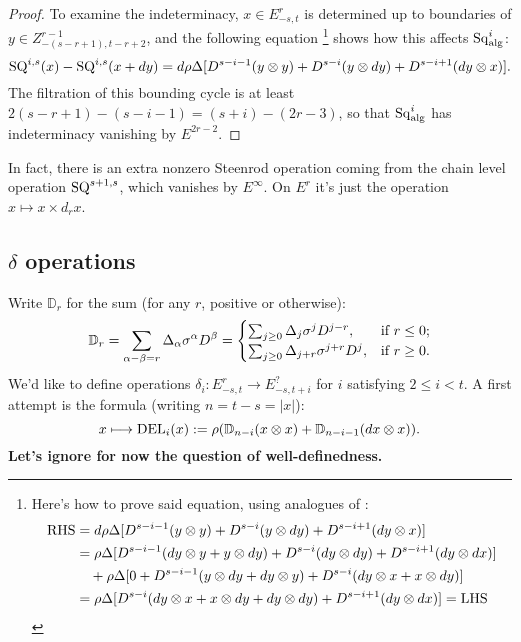 \documentclass[10pt]{article}
\newcommand{\twist}{\sigma}
\newcommand{\Sq}{\mathrm{Sq}}
\begin{document}
\begin{AdamsSSEQ operations final}
\begin{proof}
To examine the indeterminacy, $x\in E^r_{-s,t}$ is determined up to boundaries of $y\in Z^{r-1}_{-(s-r+1),t-r+2}$, and the following equation%
\footnote{Here's how to prove said equation, using analogues of \cite[(1.111),(1.112)]{MR2245560}:
\begin{alignat*}{2}
\textup{RHS}
&=
d\rho\Delta [D^{s-i-1}(y\otimes y)+D^{s-i}(y\otimes dy)+D^{s-i+1}(dy\otimes x)]%
\\
&=
\rho\Delta [D^{s-i-1}(dy\otimes y+y\otimes dy)+D^{s-i}(dy\otimes dy)+D^{s-i+1}(dy\otimes dx)]%
\\
&\ \ \ +
\rho\Delta [0+D^{s-i-1}(y\otimes dy+dy\otimes y)+D^{s-i}(dy\otimes x+x\otimes dy)]%
\\
&=
\rho\Delta [D^{s-i}(dy\otimes x+x\otimes dy+dy\otimes dy)
+D^{s-i+1}(dy\otimes dx)]=\textup{LHS}%
\end{alignat*}} shows how this affects $\Sq^{i}_\textup{alg}$:
\[\textup{SQ}^{i,s}(x)-\textup{SQ}^{i,s}(x+dy)=d\rho\Delta [D^{s-i-1}(y\otimes y)+D^{s-i}(y\otimes dy)+D^{s-i+1}(dy\otimes x)].\]
The filtration of this bounding cycle is at least $2(s-r+1)-(s-i-1)=(s+i)-(2r-3)$, so that $\Sq_\textup{alg}^i$ has indeterminacy vanishing by $E^{2r-2}$.
\end{proof}
In fact, there is an extra nonzero Steenrod operation coming from the chain level operation $\textup{SQ}^{s+1,s}$, which vanishes by $E^\infty$. On $E^r$ it's just the operation $x\mapsto x\times d_rx$.

\subsection{$\delta$ operations}

Write $\mathbb{D}_r$ for the sum (for any $r$, positive or otherwise):
\[\mathbb{D}_r=\sum_{\alpha-\beta=r}\Delta_\alpha\twist^\alpha D^\beta=\begin{cases}
\sum_{j\geq0}\Delta_{j}\twist^{j}D^{j-r},&\textup{if }r\leq0;\\
\sum_{j\geq0}\Delta_{j+r}\twist^{j+r}D^{j},&\textup{if }r\geq0.
\end{cases}
\]
We'd like to define operations $\delta_i:E^r_{-s,t}\to E^?_{-s,t+i}$ for $i$ satisfying $2\leq i<t$. A first attempt is the formula (writing $n=t-s=|x|$):
\[x\mapsto \textup{DEL}_{i}(x):=\rho(\mathbb{D}_{n-i}(x\otimes x)+\mathbb{D}_{n-i-1}(dx\otimes x)).\]
\textbf{Let's ignore for now the question of well-definedness.}

\end{AdamsSSEQ operations final}
\end{document}
